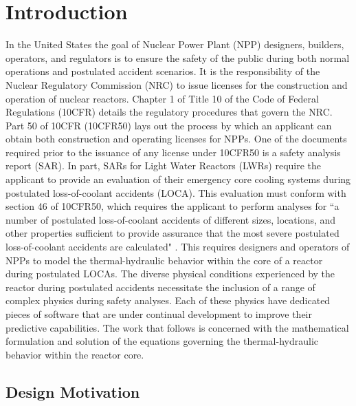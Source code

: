 \chapter{Introduction}
\label{chap:intro}
In the United States the goal of Nuclear Power Plant (NPP) designers, builders, operators, and regulators is to ensure the safety of the public during both normal operations and postulated accident scenarios.
It is the responsibility of the Nuclear Regulatory Commission (NRC) to issue licenses for the construction and operation of nuclear reactors.
Chapter 1 of Title 10 of the Code of Federal Regulations (10CFR) details the regulatory procedures that govern the NRC.
Part 50 of 10CFR (10CFR50) lays out the process by which an applicant can obtain both construction and operating licenses for NPPs.
One of the documents required prior to the issuance of any license under 10CFR50 is a safety analysis report (SAR).
In part, SARs for Light Water Reactors (LWRs) require the applicant to provide an evaluation of their emergency core cooling systems during postulated loss-of-coolant accidents (LOCA).
This evaluation must conform with section 46 of 10CFR50, which requires the applicant to perform analyses for ``a number of postulated loss-of-coolant accidents of different sizes, locations, and other properties sufficient to provide assurance that the most severe postulated loss-of-coolant accidents are calculated" \cite{CFR10}.
This requires designers and operators of NPPs to model the thermal-hydraulic behavior within the core of a reactor during postulated LOCAs.  
The diverse physical conditions experienced by the reactor during postulated accidents necessitate the inclusion of a range of complex physics during safety analyses.
Each of these physics have dedicated pieces of software that are under continual development to improve their predictive capabilities.
The work that follows is concerned with the mathematical formulation and solution of the equations governing the thermal-hydraulic behavior within the reactor core.

\section{Design Motivation}
\label{sect:motivation}

